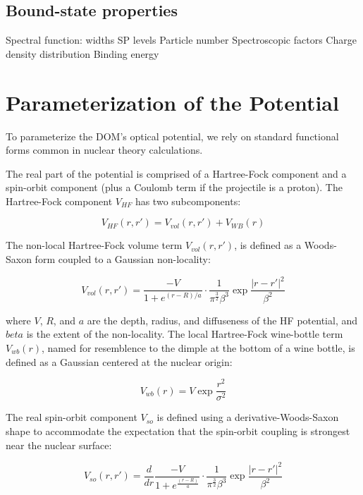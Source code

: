 \subsection{Bound-state properties}
Spectral function: widths
SP levels
Particle number
Spectroscopic factors
Charge density distribution
Binding energy

\section{Parameterization of the Potential}

To parameterize the DOM's optical potential, we rely on standard functional
forms common in nuclear theory calculations.

The real part of the potential is comprised of a Hartree-Fock component and
a spin-orbit component (plus a Coulomb term if the projectile is a proton).
The Hartree-Fock component $V_{HF}$ has two subcomponents:

\begin{equation}
    V_{HF}(r,r') = V_{vol}(r,r') + V_{WB}(r)
\end{equation}

The non-local Hartree-Fock volume term $V_{vol}(r,r')$, is defined as
a Woods-Saxon form coupled to a Gaussian non-locality:

\begin{equation}
    V_{vol}(r,r') =
    \dfrac{-V}{1+e^{(r-R)/a}}\cdot\dfrac{1}{\pi^{\frac{3}{2}}\beta^{3}}
    \exp{\frac{|r-r'|^{2}}{\beta^{2}}}
\end{equation}

where $V$, $R$, and $a$ are the depth, radius, and diffuseness of the HF potential,
and $beta$ is the extent of the non-locality. The local Hartree-Fock wine-bottle
term $V_{wb}(r)$, named for resemblence to the dimple at the bottom of a wine
bottle, is defined as a Gaussian centered at the nuclear origin:

\begin{equation}
    V_{wb}(r) = V\exp{\frac{r^{2}}{\sigma^{2}}}
\end{equation}

The real spin-orbit component $V_{so}$
is defined using a derivative-Woods-Saxon shape to
accommodate the expectation that the spin-orbit coupling is strongest near the
nuclear surface:

\begin{equation}
    V_{so}(r,r') =
    \frac{d}{dr} \frac{-V}{1+e^{\frac{(r-R)}{a}}}\cdot\frac{1}{\pi^{\frac{3}{2}}\beta^{3}} \exp{\frac{|r-r'|^{2}}{\beta^{2}}}
\end{equation}


